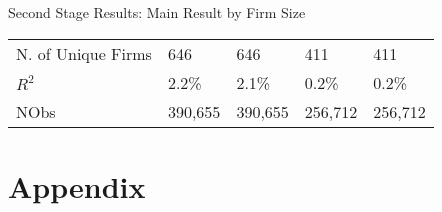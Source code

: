 \documentclass{beamer}
\begin{document}
\begin{frame}{Second Stage Results: Main Result by Firm Size}
{\begin{tabular}{l*{4}{l}}
            N. of Unique Firms & 646                              & 646                              & 411      & 411     \\
            \(R^{2}\)          & 2.2\%                            & 2.1\%                            & 0.2\%    & 0.2\%   \\
            NObs               & 390,655                          & 390,655                          & 256,712  & 256,712 \\
            \bottomrule
        \end{tabular}
    }

\end{frame}








\section{Appendix}



























\end{document}
